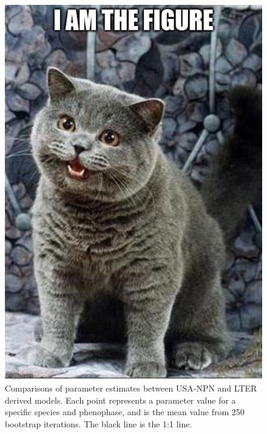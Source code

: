 
\begin{figure}
	\centering
		\includegraphics[scale=0.3]{images/figure_filler.jpg}
    \caption[Comparisons of parameter estimates between USA-NPN and LTER derived models]{Comparisons of parameter estimates between USA-NPN and LTER derived models. Each point represents a parameter value for a specific species and phenophase, and is the mean value from 250 bootstrap iterations. The black line is the 1:1 line.} \label{fig-2-2}
\end{figure}


